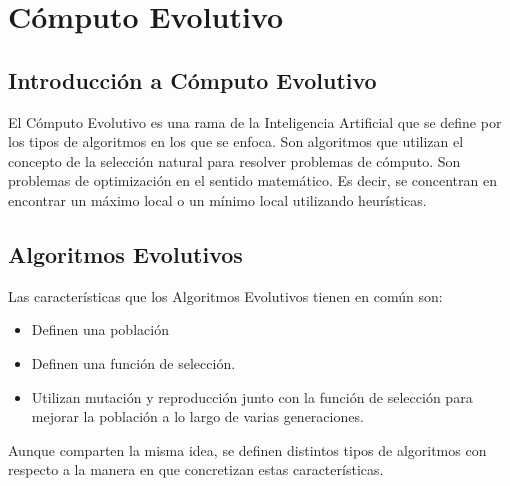 
\chapter{Cómputo Evolutivo}\label{ch:evolucion}

\section{Introducción a Cómputo Evolutivo}

El \gls{Cómputo Evolutivo} es una rama de la Inteligencia Artificial que se define
por los tipos de algoritmos en los que se enfoca. Son algoritmos que utilizan
el concepto de la selección natural para resolver problemas de cómputo. Son
problemas de optimización en el sentido matemático. Es decir, se concentran en
encontrar un máximo local o un mínimo local utilizando heurísticas.


\section{Algoritmos Evolutivos}

Las características que los Algoritmos Evolutivos tienen en común son:

\begin{itemize}
\item Definen una población
\item Definen una función de selección.
\item Utilizan mutación y reproducción junto con la función de selección para
mejorar la población a lo largo de varias generaciones.
\end{itemize}

Aunque comparten la misma idea, se definen distintos tipos de algoritmos con
respecto a la manera en que concretizan estas características.

